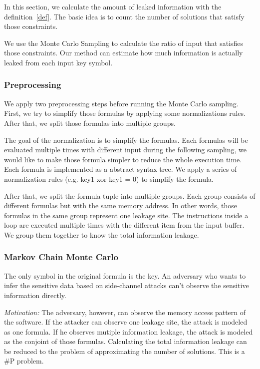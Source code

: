 In this section, we calculate the amount of leaked information with the
definition~\ref{def}. The basic idea is to count the number of solutions 
that satisfy those constraints.

We use the Monte Carlo Sampling to calculate the ratio of input that satisfies 
those constraints. Our method can estimate how much information is actually 
leaked from each input key symbol.

\subsubsection{Preprocessing}
We apply two preprocessing steps before running the Monte Carlo sampling. First,
we try to simplify those formulas by applying some normalizations rules. After
that, we split those formulas into multiple groups.

The goal of the normalization is to simplify the formulas. 
Each formulas will be evaluated multiple times with different input 
during the following sampling, 
we would like to make those formula simpler to reduce the whole execution time.  
Each formula is implemented as a abstract syntax tree. We apply a series of 
normalization rules (e.g. key1 xor key1 = 0) to simplify the formula.

After that, we split the formula tuple into multiple groups. 
Each group consists of different formulas but with the same memory address.
In other words, those formulas in the same group represent one leakage
site. The instructions inside a loop are executed multiple times with
the different item from the input buffer. We group them together to 
know the total information leakage.

\subsubsection{Markov Chain Monte Carlo}
The only symbol in the original formula is the key. 
An adversary who wants to infer the sensitive data based on side-channel 
attacks can't observe the sensitive information directly. 

\textit{Motivation:}
The adversary, however, can observe the memory access pattern of the software. 
If the attacker can observe one leakage site, the attack is modeled as one formula. 
If he observes mutiple information leakage, the attack is modeled as the conjoint 
of those formulas. Calculating the total information leakage can be reduced to the
problem of approximating the number of solutions. This is a \#P problem.

